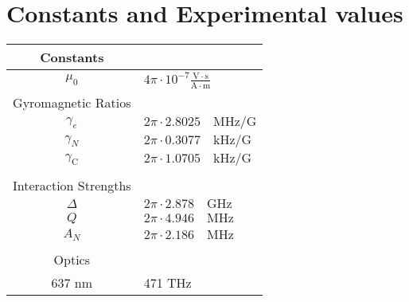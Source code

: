 
\chapter{Constants and Experimental values}


\begin{table}[htbp]
    \begin{tabular}{cl}
    Constants  \\ \hline
    $\mu_0$&$4\pi \cdot 10^{-7 }\mathrm{\frac{V \cdot s}{A\cdot m}}$\\
    Gyromagnetic Ratios  \\ \hline
    $\gamma_e $ & $2\pi \cdot 2.8025\quad \mathrm{MHz/G} $ \\
    $\gamma_{N}$ & $2\pi \cdot 0.3077\quad \mathrm{kHz/G}$   \\
    $\gamma_\mathrm{C}$ & $2\pi \cdot 1.0705\quad \mathrm{kHz/G}$   \\ \hline
    \\
    Interaction Strengths  \\ \hline
    $\Delta $ & $2\pi \cdot 2.878\quad \mathrm{GHz} $\\
    $Q $ & $2\pi \cdot 4.946\quad \mathrm{MHz} $\\
    $A_N $ & $2\pi \cdot 2.186\quad \mathrm{MHz} $\\ \hline
    \\
    Optics\\ \hline
    637 nm & 471 THz \\ \hline
    \end{tabular}
    \label{tbl:constants and experimental values}
\end{table}
